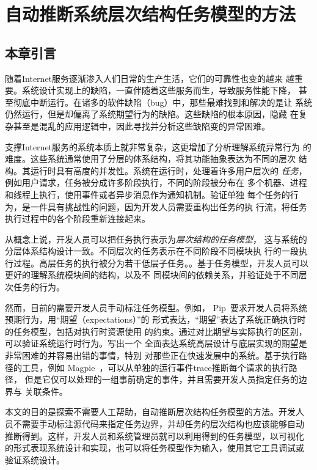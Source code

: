 \chapter{自动推断系统层次结构任务模型的方法}
\label{chap:scalpel}

\section{本章引言}

随着Internet服务逐渐渗入人们日常的生产生活，它们的可靠性也变的越来
越重要。系统设计实现上的缺陷，一直伴随着这些服务而生，导致服务性能下降，
甚至彻底中断运行。在诸多的软件缺陷（bug）中，那些最难找到和解决的是让
系统仍然运行，但是却偏离了系统期望行为的缺陷。这些缺陷的根本原因，隐藏
在复杂甚至是混乱的应用逻辑中，因此寻找并分析这些缺陷变的异常困难。

支撑Internet服务的系统本质上就非常复杂，这更增加了分析理解系统异常行为
的难度。这些系统通常使用了分层的体系结构，将其功能抽象表达为不同的层次
结构。其运行时具有高度的并发性。系统在运行时，处理着许多用户层次的
\emph{任务}，例如用户请求，任务被分成许多阶段执行，不同的阶段被分布在
多个机器、进程和线程上执行，使用事件或者异步消息作为通知机制。验证单独
每个任务的行为，是一件具有挑战性的问题，因为开发人员需要重构出任务的执
行流，将任务执行过程中的各个阶段重新连接起来。

从概念上说，开发人员可以把任务执行表示为\emph{层次结构的任务模型}，
这与系统的分层体系结构设计一致。不同层次的任务表示在不同阶段不同模块执
行的一段执行过程。高层任务的执行被分为若干低层子任务。。基于任务模型，开发人员可以更好的理解系统模块间的结构，以及不
同模块间的依赖关系，并验证处于不同层次任务的行为。

然而，目前的需要开发人员手动标注任务模型。例如，
Pip~\cite{pip}要求开发人员将系统预期行为，用“期望（expectations）”的
形式表达，“期望”表达了系统正确执行时的任务模型，包括对执行时资源使用
的约束。通过对比期望与实际执行的区别，可以验证系统运行时行为。写出一个
全面表达系统高层设计与底层实现的期望是非常困难的并容易出错的事情，特别
对那些正在快速发展中的系统。基于执行路径的工具，例如
Magpie~\cite{magpie}，可以从单独的运行事件trace推断每个请求的执行路径，
但是它仅可以处理的一组事前确定的事件，并且需要开发人员指定任务的边界与
关联条件。

本文的目的是探索不需要人工帮助，自动推断层次结构任务模型的方法。开发人
员不需要手动标注源代码来指定任务边界，并却任务的层次结构也应该能够自动
推断得到。这样，开发人员和系统管理员就可以利用得到的任务模型，以可视化
的形式表现系统设计和实现，也可以将任务模型作为输入，使用其它工具调试或
验证系统设计。

